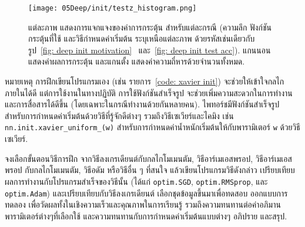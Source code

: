 \begin{figure}
	\begin{center}	
		\texttt{[image: 05Deep/init/testz\_histogram.png]}
	\end{center}		
	\caption[การแจกแจงของค่าการกระตุ้น]{แต่ละภาพ แสดงการแจกแจงของค่าการกระตุ้น สำหรับแต่ละกรณี (ความลึก ฟังก์ชันกระตุ้นที่ใช้ และวิธีกำหนดค่าเริ่มต้น ระบุเหนือแต่ละภาพ ด้วยรหัสเช่นเดียวกับรูป~\ref{fig: deep init motivation}~ และ~\ref{fig: deep init test acc}). แกนนอน แสดงค่าผลการกระตุ้น และแกนตั้ง แสดงค่าความถี่หารด้วยจำนวนทั้งหมด.}
	\label{fig: deep init z hist}
\end{figure}
%


หมายเหตุ การฝึกเขียนโปรแกรมเอง (เช่น รายการ~\ref{code: xavier init}) จะช่วยให้เข้าใจกลไกภายในได้ดี
แต่การใช้งานในทางปฏิบัติ
การใช้ฟังก์ชันสำเร็จรูป จะช่วยเพิ่มความสะดวกในการทำงานและการสื่อสารได้ดีขึ้น 
(โดยเฉพาะในกรณีทำงานด้วยกันหลายคน).
ไพทอร์ชมีฟังก์ชันสำเร็จรูป
สำหรับการกำหนดค่าเริ่มต้นด้วยวิธีที่รู้จักดีต่างๆ รวมถึงวิธีเซเวียร์และไคมิง เช่น
\verb|nn.init.xavier_uniform_(w)|
สำหรับการกำหนดค่าน้ำหนักเริ่มต้นให้กับพารามิเตอร์ \texttt{w} ด้วยวิธีเซเวียร์.




%
%	
%
%

\begin{Exercise}
\label{ex: deep optim}

จงเลือกขั้นตอนวิธีการฝึก จากวิธีลงเกรเดียนต์กับกลไกโมเมนตัม,
วิธีอาร์เมเอสพรอป,
วิธีอาร์เมเอสพรอป กับกลไกโมเมนตัม,
วิธีอดัม หรือวิธีอื่น ๆ ที่สนใจ
แล้วเขียนโปรแกรมวิธีดังกล่าว
เปรียบเทียบผลการทำงานกับโปรแกรมสำเร็จของวิธีนั้น
(ได้แก่ \texttt{optim.SGD},
\texttt{optim.RMSprop}, และ \texttt{optim.Adam})
และเปรียบเทียบกับวิธีลงเกรเดียนต์
เลือกชุดข้อมูลขึ้นมาเพื่อทดสอบ
ออกแบบการทดลอง เพื่อวัดผลทั้งในเชิงความเร็วและคุณภาพในการเรียนรู้ รวมถึงความทนทานต่อค่าอภิมานพารามิเตอร์ต่างๆที่เลือกใช้
และความทนทานกับการกำหนดค่าเริ่มต้นแบบต่างๆ
อภิปราย และสรุป.
	
\end{Exercise}


